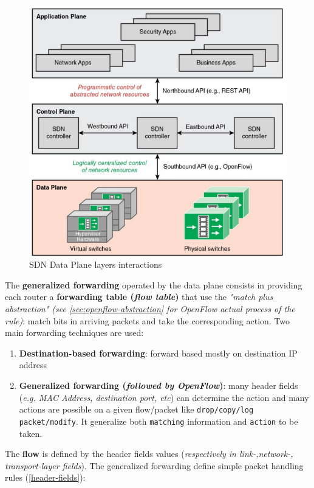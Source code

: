 \documentclass[10pt,a4paper]{report}
\theoremstyle{definition}
\begin{document}
\begin{figure}
	\centering\includegraphics[scale=0.50]{images/Pasted image 20230322112942.png}
	\caption{SDN Data Plane layers interactions}
	\label{data-plane}
\end{figure}
The \textbf{generalized forwarding} operated by the data plane consists in providing each router a \textbf{forwarding table (\textit{flow table})} that use the \textit{"match plus abstraction" (see \ref{sec:openflow-abstraction} for OpenFlow actual process of the rule)}: match bits in arriving packets and take the corresponding action. Two main forwarding techniques are used:
\begin{enumerate}
	\item 
	\textbf{Destination-based forwarding}: forward based mostly on destination IP address
	\item 
	\textbf{Generalized forwarding (\textit{followed by OpenFlow})}: many header fields (\textit{e.g. MAC Address, destination port, etc}) can determine the action and many actions are possible on a given flow/packet like \texttt{drop/copy/log packet/modify}. It generalize both \texttt{matching} information and \texttt{action} to be taken.
	
\end{enumerate}
The \textbf{flow} is defined by the header fields values (\textit{respectively in link-,network-, transport-layer fields}). The generalized forwarding define simple packet handling rules (\ref{header-fields}):
\end{document}

